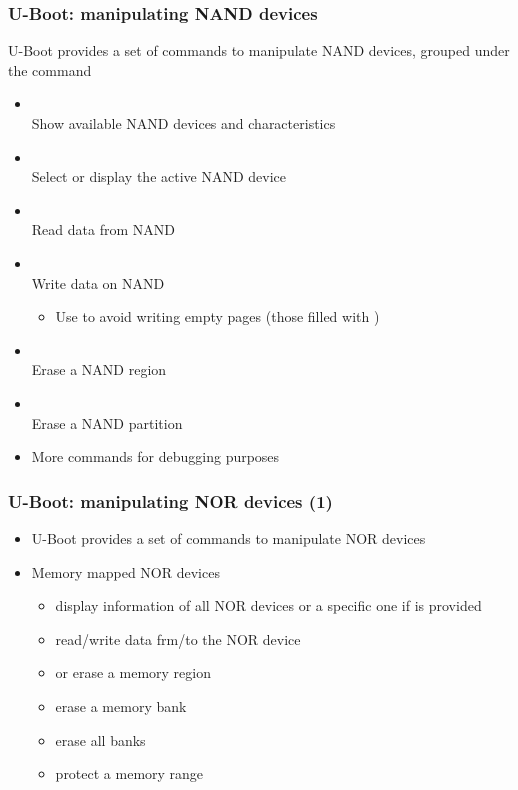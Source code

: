 \begin{frame}
  \frametitle{U-Boot: manipulating NAND devices}
  U-Boot provides a set of commands to manipulate NAND devices,
  grouped under the  command
  \begin{itemize}
  \item {}\\
    Show available NAND devices and characteristics
  \item {}\\
    Select or display the active NAND device
  \item {}\\
    Read data from NAND
  \item {}\\
    Write data on NAND
    \begin{itemize}
      \item Use  to avoid writing empty pages
      (those filled with )
    \end{itemize}
  \item {}\\
    Erase a NAND region
  \item {}\\
    Erase a NAND partition
  \item More commands for debugging purposes
  \end{itemize}
\end{frame}

\begin{frame}
  \frametitle{U-Boot: manipulating NOR devices (1)}
  \begin{itemize}
  \item U-Boot provides a set of commands to manipulate NOR devices
  \item Memory mapped NOR devices
    \begin{itemize}
    \item {} display information of all NOR devices
      or a specific one if  is provided
    \item {} read/write data frm/to
      the NOR device
    \item {} or 
      erase a memory region
    \item {} erase a memory bank
    \item {} erase all banks
    \item {} protect a memory
      range
    \end{itemize}
  \end{itemize}
\end{frame}

